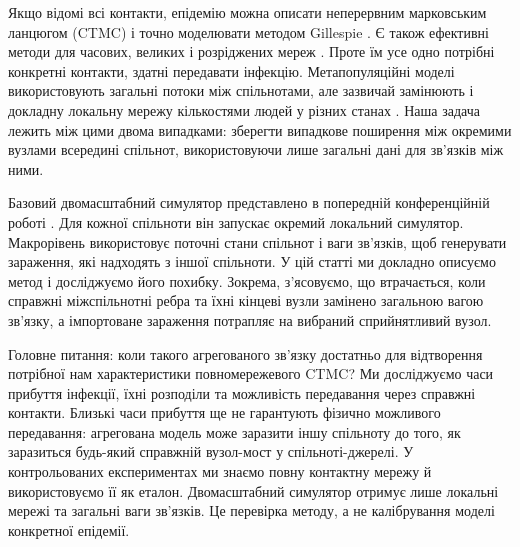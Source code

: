 Якщо відомі всі контакти, епідемію можна описати неперервним марковським ланцюгом (CTMC) і точно моделювати методом Gillespie \citep{gillespie1977exact,gibson2000}. Є також ефективні методи для часових, великих і розріджених мереж \citep{vestergaard2015,kuryliak2025simulating}. Проте їм усе одно потрібні конкретні контакти, здатні передавати інфекцію. Метапопуляційні моделі використовують загальні потоки між спільнотами, але зазвичай замінюють і докладну локальну мережу кількостями людей у різних станах \citep{colizza2007reaction,colizza2008,balcan2010modeling,ajelli2010}. Наша задача лежить між цими двома випадками: зберегти випадкове поширення між окремими вузлами всередині спільнот, використовуючи лише загальні дані для зв'язків між ними.

Базовий двомасштабний симулятор представлено в попередній конференційній роботі \citep{kuryliak2025towards}. Для кожної спільноти він запускає окремий локальний симулятор. Макрорівень використовує поточні стани спільнот і ваги зв'язків, щоб генерувати зараження, які надходять з іншої спільноти. У цій статті ми докладно описуємо метод і досліджуємо його похибку. Зокрема, з'ясовуємо, що втрачається, коли справжні міжспільнотні ребра та їхні кінцеві вузли замінено загальною вагою зв'язку, а імпортоване зараження потрапляє на вибраний сприйнятливий вузол.

Головне питання: коли такого агрегованого зв'язку достатньо для відтворення потрібної нам характеристики повномережевого CTMC? Ми досліджуємо часи прибуття інфекції, їхні розподіли та можливість передавання через справжні контакти. Близькі часи прибуття ще не гарантують фізично можливого передавання: агрегована модель може заразити іншу спільноту до того, як заразиться будь-який справжній вузол-мост у спільноті-джерелі. У контрольованих експериментах ми знаємо повну контактну мережу й використовуємо її як еталон. Двомасштабний симулятор отримує лише локальні мережі та загальні ваги зв'язків. Це перевірка методу, а не калібрування моделі конкретної епідемії.


